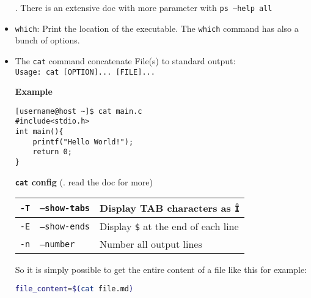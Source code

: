 \documentclass{article}
\newcommand{\inlinecode}[1]{\colorbox{backcolour}{\footnotesize{\texttt{#1}}}}
\begin{document}
\begin{itemize}
	      \faWarning. There is an extensive doc with more parameter with \inlinecode{ps --help all}

	\item \inlinecode{which}: Print the location of the executable. The \inlinecode{which} command has also a bunch of options.

	\item The \inlinecode{cat} command concatenate File(s) to standard output:\\
	      \inlinecode{Usage: cat [OPTION]... [FILE]...}

	      \begin{paracol}{2}
		      \raggedright \textbf{Example}
		      \begin{lstlisting}[style=terminal]
[username@host ~]$ cat main.c
#include<stdio.h>
int main(){
    printf("Hello World!");
    return 0;
}
\end{lstlisting}

		      \switchcolumn

		      \raggedright \textbf{\inlinecode{cat} config} (\faWarning. read the doc for more)

		      \footnotesize{
			      \begin{tabularx}{\linewidth}{| r | >{\raggedright\arraybackslash}X |>{\raggedright\arraybackslash}X |}\hline
				      \inlinecode{-T} & \inlinecode{--show-tabs} & Display TAB characters as \inlinecode{\^I}      \\\hline
				      \inlinecode{-E} & \inlinecode{--show-ends} & Display \inlinecode{\$} at the end of each line \\\hline
				      \inlinecode{-n} & \inlinecode{--number}    & Number all output lines                         \\\hline
			      \end{tabularx}
		      }

	      \end{paracol}
	      So it is simply possible to get the entire content of a file like this for example:
	      \begin{lstlisting}[style=command, language=bash]
file_content=$(cat file.md)
\end{lstlisting}


\end{itemize}
\end{document}
